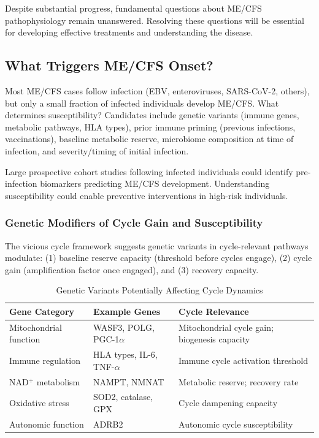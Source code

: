 Despite substantial progress, fundamental questions about ME/CFS pathophysiology remain unanswered. Resolving these questions will be essential for developing effective treatments and understanding the disease.

\subsection{What Triggers ME/CFS Onset?}

Most ME/CFS cases follow infection (EBV, enteroviruses, SARS-CoV-2, others), but only a small fraction of infected individuals develop ME/CFS. What determines susceptibility? Candidates include genetic variants (immune genes, metabolic pathways, HLA types), prior immune priming (previous infections, vaccinations), baseline metabolic reserve, microbiome composition at time of infection, and severity/timing of initial infection.

Large prospective cohort studies following infected individuals could identify pre-infection biomarkers predicting ME/CFS development. Understanding susceptibility could enable preventive interventions in high-risk individuals.

\subsubsection{Genetic Modifiers of Cycle Gain and Susceptibility}
\label{subsubsec:genetic-cycle-modifiers}

The vicious cycle framework suggests genetic variants in cycle-relevant pathways modulate: (1) baseline reserve capacity (threshold before cycles engage), (2) cycle gain (amplification factor once engaged), and (3) recovery capacity.

\begin{table}[htbp]
\centering
\caption{Genetic Variants Potentially Affecting Cycle Dynamics}
\label{tab:genetic-cycle-modifiers}
\begin{tabular}{p{3cm}p{4cm}p{5.5cm}}
\toprule
\textbf{Gene Category} & \textbf{Example Genes} & \textbf{Cycle Relevance} \\
\midrule
Mitochondrial function & WASF3, POLG, PGC-1$\alpha$ & Mitochondrial cycle gain; biogenesis capacity \\
\addlinespace
Immune regulation & HLA types, IL-6, TNF-$\alpha$ & Immune cycle activation threshold \\
\addlinespace
NAD$^+$ metabolism & NAMPT, NMNAT & Metabolic reserve; recovery rate \\
\addlinespace
Oxidative stress & SOD2, catalase, GPX & Cycle dampening capacity \\
\addlinespace
Autonomic function & ADRB2 & Autonomic cycle susceptibility \\
\bottomrule
\end{tabular}
\end{table}

